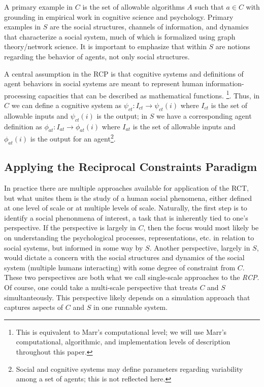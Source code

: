 \documentclass{article}
\begin{document}
 A primary example in $C$ is the set of allowable algorithms $A$ such that $a \in C$ with grounding in empirical work in cognitive science and psychology.    Primary examples in $S$ are the social structures, channels of information, and dynamics that characterize a social system, much of which is formalized using graph theory/network science.    It is important to emphasize that within $S$ are notions regarding the behavior of agents, not only social structures.

A central assumption in the RCP is that cognitive systems and definitions of agent behaviors in social systems are meant to represent human information-processing capacities that can be described as mathematical functions. \cite{van Rooij, 2008}\footnote{This is equivalent to Marr's computational level; we will use Marr's computational, algorithmic, and implementation levels of description\cite{Marr,1981} throughout this paper.}. Thus, in $C$ we can define a cognitive system as $\psi_{ct}: I_{ct} \rightarrow \psi_{ct}(i)$ where $I_{ct}$ is the set of allowable inputs and $\psi_{ct}(i)$ is the output; in $S$ we have a corresponding agent definition as $\phi_{at}: I_{at} \rightarrow \phi_{at}(i)$ where $I_{at}$ is the set of allowable inputs and $\phi_{at}(i)$ is the output for an agent\footnote{Social and cognitive systems may define parameters regarding variability among a set of agents; this is not reflected here.}. 

\subsection{Applying the Reciprocal Constraints Paradigm}   
In practice there are multiple approaches available for application of the RCT, but what unites them is the study of a human social phenomena, either defined at one level of scale or at multiple levels of scale.  Naturally, the first step is to identify a social phenonmena of interest, a task that is inherently tied to one's perspective.  If the perspective is largely in $C$, then the focus would most likely be on understanding the psychological processes, representations, etc. in relation to social systems, but informed in some way by $S$.   Another perspective, largely in $S$, would dictate a concern with the social structures and dynamics of the social system (multiple humans interacting) with some degree of constraint from $C$.  These two perspectives are both what we call single-scale approaches to the \textit{RCP}. Of course, one could take a multi-scale perspective that treats $C$ and $S$ simultanteously. This perspective likely depends on a simulation approach that captures aspects of $C$ and $S$ in one runnable system.  
\end{document}
